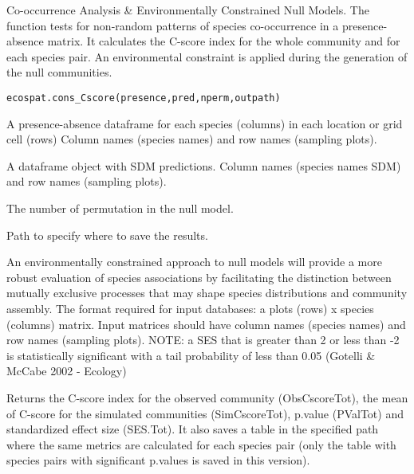 \documentclass[a4paper]{book}
\begin{document}
%
\begin{Description}\relax
Co-occurrence Analysis \& Environmentally Constrained Null Models. The function tests for non-random patterns of species co-occurrence in a presence-absence matrix. It calculates the C-score index for the whole community and for each species pair. An environmental constraint is applied during the generation of the null communities.
\end{Description}
%
\begin{Usage}
\begin{verbatim}
ecospat.cons_Cscore(presence,pred,nperm,outpath)
\end{verbatim}
\end{Usage}
%
\begin{Arguments}
\begin{ldescription}
\item[\code{presence}] A presence-absence dataframe for each species (columns) in each location or grid cell (rows) Column names (species names) and row names (sampling plots).
\item[\code{pred}] A dataframe object with SDM predictions. Column names (species names SDM) and row names (sampling plots).
\item[\code{nperm}] The number of permutation in the null model.
\item[\code{outpath}] Path to specify where to save the results.

\end{ldescription}
\end{Arguments}
%
\begin{Details}\relax
An environmentally constrained approach to null models will provide a more robust evaluation of species associations by facilitating the distinction between mutually exclusive processes that may shape species distributions and community assembly.
The format required for input databases: a plots (rows) x species (columns) matrix. Input matrices should have column names (species names) and row names (sampling plots).
NOTE: a SES that is greater than 2 or less than -2 is statistically significant with a tail probability of less than 0.05 (Gotelli \& McCabe 2002 - Ecology)
\end{Details}
%
\begin{Value}
Returns the C-score index for the observed community (ObsCscoreTot), the mean of C-score for the simulated communities (SimCscoreTot), p.value (PValTot) and standardized effect size (SES.Tot). It also saves a table in the specified path where the same 
metrics are calculated for each species pair (only the table with species pairs with significant p.values is saved in this version). 
\end{Value}
\end{document}
